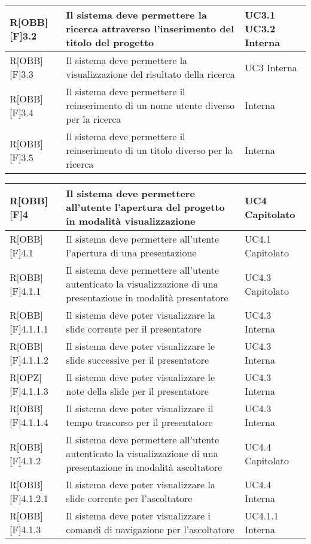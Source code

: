 \begin{table}[H]
\begin{tabular}{|p{}|p{}|p{}|}
			R[OBB][F]3.2 & Il sistema deve permettere la ricerca attraverso
			l'inserimento del titolo del progetto & UC3.1 UC3.2 Interna\\ \midrule 
			R[OBB][F]3.3 & Il sistema deve permettere la visualizzazione del risultato della ricerca & UC3 Interna\\ \midrule 
			R[OBB][F]3.4 & Il sistema deve permettere il reinserimento di un nome utente diverso per la ricerca & Interna\\ \midrule 
			R[OBB][F]3.5 & Il sistema deve permettere il reinserimento di un titolo diverso per la ricerca & Interna\\ \midrule 
		\end{tabular}
	\end{table}
	\newpage

	\begin{table}[H]
		\begin{tabular}{|p{}|p{}|p{}|}
			\midrule
			R[OBB][F]4 & Il sistema deve permettere all'utente l'apertura del progetto in modalità visualizzazione & UC4 Capitolato\\ \midrule 
			R[OBB][F]4.1 & Il sistema deve permettere all'utente l'apertura di
			una presentazione & UC4.1 Capitolato\\ \midrule 
			R[OBB][F]4.1.1 & Il sistema deve permettere all'utente autenticato
			la visualizzazione di una presentazione in modalità
			presentatore & UC4.3 Capitolato\\ \midrule 
			R[OBB][F]4.1.1.1 & Il sistema deve poter visualizzare la slide corrente
			per il presentatore & UC4.3 Interna\\ \midrule 
			R[OBB][F]4.1.1.2 & Il sistema deve poter visualizzare le slide successive
			per il presentatore & UC4.3 Interna\\ \midrule 
			R[OPZ][F]4.1.1.3 & Il sistema deve poter visualizzare le note della slide per il presentatore & UC4.3 Interna\\ \midrule 
			R[OBB][F]4.1.1.4 & Il sistema deve poter visualizzare il tempo trascorso per il presentatore & UC4.3 Interna\\ \midrule 
			R[OBB][F]4.1.2 & Il sistema deve permettere all'utente autenticato
			la visualizzazione di una presentazione in modalità
			ascoltatore & UC4.4 Capitolato\\ \midrule 
			R[OBB][F]4.1.2.1 & Il sistema deve poter visualizzare la slide corrente
			per l'ascoltatore & UC4.4 Interna\\ \midrule 
			R[OBB][F]4.1.3 & Il sistema deve poter visualizzare i comandi di navigazione per l'ascoltatore & UC4.1.1 Interna\\ \midrule 

\end{tabular}
\end{table}
